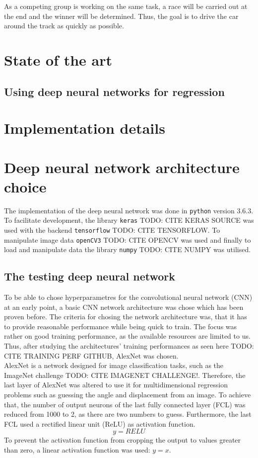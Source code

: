 \documentclass[10pt,a4paper,twoside,journal]{IEEEtran}
\begin{document}
As a competing group is working on the same task, a race will be carried out at the end and the winner will be determined. Thus, the goal is to drive the car around the track as quickly as possible.

\section{State of the art}
\label{sc:sota}
\the\textwidth

\subsection{Using deep neural networks for regression}

\section{Implementation details}

\section{Deep neural network architecture choice}
The implementation of the deep neural network was done in \texttt{python} version 3.6.3. To facilitate development, the library \texttt{keras} TODO: CITE KERAS SOURCE was used with the backend \texttt{tensorflow} TODO: CITE TENSORFLOW. To manipulate image data \texttt{openCV3} TODO: CITE OPENCV was used and finally to load and manipulate data the library \texttt{numpy} TODO: CITE NUMPY was utilised. 
\subsection{The testing deep neural network}
\label{ssc:testing-dnn}
To be able to chose hyperparametres for the convolutional neural network (CNN) at an early point, a basic CNN network architecture was chose which has been proven before. The criteria for chosing the network architecture was, that it has to provide reasonable performance while being quick to train. The focus was rather on good training performance, as the available resources are limited to us. Thus, after studying the architectures' training performances as seen here TODO: CITE TRAINING PERF GITHUB, AlexNet \cite{alexnet2012imagenet} was chosen.\\
AlexNet is a network designed for image classification tasks, such as the ImageNet challenge TODO: CITE IMAGENET CHALLENGE!. Therefore, the last layer of AlexNet was altered to use it for multidimensional regression problems such as guessing the angle and displacement from an image. To achieve that, the number of output neurons of the last fully connected layer (FCL) was reduced from 1000 to 2, as there are two numbers to guess. Furthermore, the last FCL used a rectified linear unit (ReLU) as activation function. 
\begin{equation}
	y = RELU
\end{equation}
To prevent the activation function from cropping the output to values greater than zero, a linear activation function was used: $ y = x $.
\end{document}
